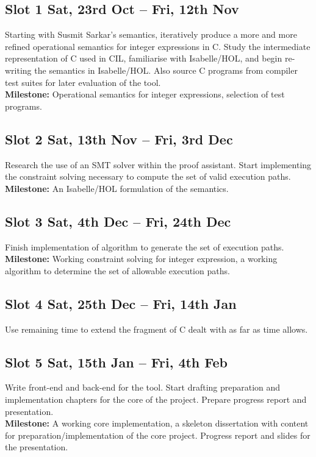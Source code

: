 \documentclass[12pt,a4paper,titlepage]{article}
\begin{document}
\subsection*{Slot 1 \hfill {\small Sat, 23rd Oct -- Fri, 12th Nov}}
Starting with Susmit Sarkar's semantics, iteratively produce a more and more refined operational semantics for integer expressions in C. Study the intermediate representation of C used in CIL, familiarise with Isabelle/HOL, and begin re-writing the semantics in Isabelle/HOL. Also source C programs from compiler test suites for later evaluation of the tool. 
\\
{\bfseries Milestone:} Operational semantics for integer expressions, selection of test programs.

\subsection*{Slot 2 \hfill {\small Sat, 13th Nov -- Fri, 3rd Dec}}
Research the use of an SMT solver within the proof assistant. Start implementing the constraint solving necessary to compute the set of valid execution paths.
\\
{\bfseries Milestone:} An Isabelle/HOL formulation of the semantics.

\subsection*{Slot 3 \hfill {\small Sat, 4th Dec -- Fri, 24th Dec}}
Finish implementation of algorithm to generate the set of execution paths. 
\\
{\bfseries Milestone:} Working constraint solving for integer expression, a working algorithm to determine the set of allowable execution paths.

\subsection*{Slot 4 \hfill {\small Sat, 25th Dec -- Fri, 14th Jan}}
Use remaining time to extend the fragment of C dealt with as far as time allows.

\subsection*{Slot 5 \hfill {\small Sat, 15th Jan -- Fri, 4th Feb}}
Write front-end and back-end for the tool. Start drafting preparation and implementation chapters for the core of the project. Prepare progress report and presentation.
\\
{\bfseries Milestone:} A working core implementation, a skeleton dissertation with content for preparation/implementation of the core project. Progress report and slides for the presentation.
\end{document}
